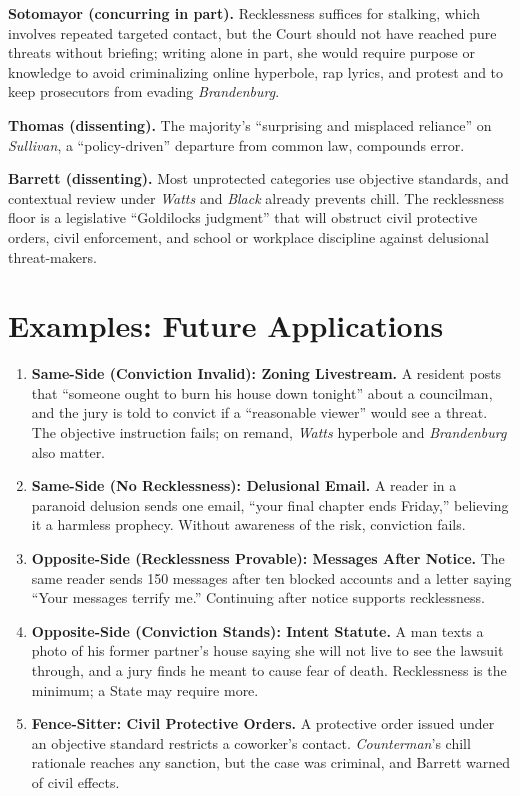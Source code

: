 \documentclass[12pt]{article}
\begin{document}
\textbf{Sotomayor (concurring in part).} Recklessness suffices for stalking, which involves repeated targeted contact, but the Court should not have reached pure threats without briefing; writing alone in part, she would require purpose or knowledge to avoid criminalizing online hyperbole, rap lyrics, and protest and to keep prosecutors from evading \textit{Brandenburg}.

\textbf{Thomas (dissenting).} The majority's ``surprising and misplaced reliance'' on \textit{Sullivan}, a ``policy-driven'' departure from common law, compounds error.

\textbf{Barrett (dissenting).} Most unprotected categories use objective standards, and contextual review under \textit{Watts} and \textit{Black} already prevents chill. The recklessness floor is a legislative ``Goldilocks judgment'' that will obstruct civil protective orders, civil enforcement, and school or workplace discipline against delusional threat-makers.

\section{Examples: Future Applications}

\begin{enumerate}
\item \textbf{Same-Side (Conviction Invalid): Zoning Livestream.} A resident posts that ``someone ought to burn his house down tonight'' about a councilman, and the jury is told to convict if a ``reasonable viewer'' would see a threat. The objective instruction fails; on remand, \textit{Watts} hyperbole and \textit{Brandenburg} also matter.
\item \textbf{Same-Side (No Recklessness): Delusional Email.} A reader in a paranoid delusion sends one email, ``your final chapter ends Friday,'' believing it a harmless prophecy. Without awareness of the risk, conviction fails.
\item \textbf{Opposite-Side (Recklessness Provable): Messages After Notice.} The same reader sends 150 messages after ten blocked accounts and a letter saying ``Your messages terrify me.'' Continuing after notice supports recklessness.
\item \textbf{Opposite-Side (Conviction Stands): Intent Statute.} A man texts a photo of his former partner's house saying she will not live to see the lawsuit through, and a jury finds he meant to cause fear of death. Recklessness is the minimum; a State may require more.
\item \textbf{Fence-Sitter: Civil Protective Orders.} A protective order issued under an objective standard restricts a coworker's contact. \textit{Counterman}'s chill rationale reaches any sanction, but the case was criminal, and Barrett warned of civil effects.
\end{enumerate}
\end{document}
